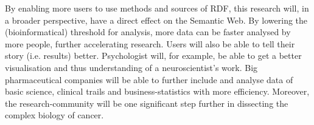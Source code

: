 \documentclass[twoside,fontsize=12pt]{article}
\renewcommand\thesection{\Roman{section}} %
\begin{document}
By enabling more users to use methods and sources of RDF, this research will, in a broader perspective, have a direct effect on the Semantic Web. By lowering the (bioinformatical) threshold for analysis, more data can be faster analysed by more people, further accelerating research. Users will also be able to tell their story (i.e. results) better. Psychologist will, for example, be able to get a better visualisation and thus understanding of a neuroscientist's work. Big pharmaceutical companies will be able to further include and analyse data of basic science, clinical trails and business-statistics with more efficiency. Moreover, the research-community will be one significant step further in dissecting the complex biology of cancer.


%
%
%






\begin{tiny}


 \end{tiny}
%
%
\end{document}
